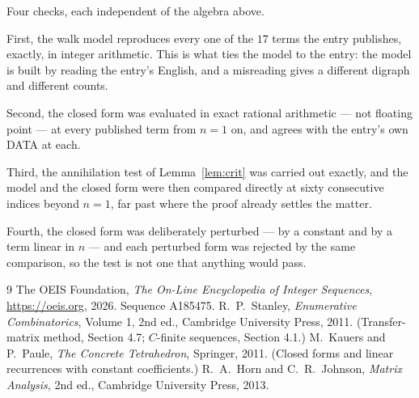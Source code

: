\documentclass[11pt,a4paper]{article}
\theoremstyle{plain}
\theoremstyle{definition}
\begin{document}
Four checks, each independent of the algebra above.

First, the walk model reproduces every one of the $17$ terms the entry publishes,
exactly, in integer arithmetic. This is what ties the model to the entry: the model is built
by reading the entry's English, and a misreading gives a different digraph and different
counts.

Second, the closed form was evaluated in exact rational arithmetic --- not floating point ---
at every published term from $n=1$ on, and agrees with the entry's own DATA at each.

Third, the annihilation test of Lemma~\ref{lem:crit} was carried out exactly, and the model
and the closed form were then compared directly at sixty consecutive indices beyond
$n=1$, far past where the proof already settles the matter.

Fourth, the closed form was deliberately perturbed --- by a constant and by a term linear in
$n$ --- and each perturbed form was rejected by the same comparison, so the test is not one
that anything would pass.

\begin{thebibliography}{9}
 The OEIS Foundation, \emph{The On-Line Encyclopedia of Integer
Sequences}, \url{https://oeis.org}, 2026. Sequence A185475.
 R.~P.~Stanley, \emph{Enumerative Combinatorics}, Volume 1, 2nd ed.,
Cambridge University Press, 2011. (Transfer-matrix method, Section 4.7; $C$-finite sequences,
Section 4.1.)
 M.~Kauers and P.~Paule, \emph{The Concrete Tetrahedron}, Springer, 2011.
(Closed forms and linear recurrences with constant coefficients.)
 R.~A.~Horn and C.~R.~Johnson, \emph{Matrix Analysis}, 2nd ed., Cambridge
University Press, 2013.
\end{thebibliography}
\end{document}
